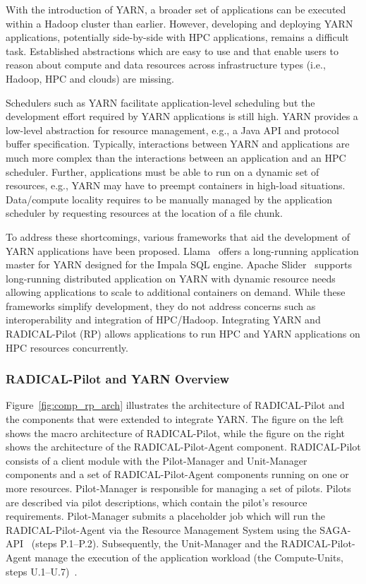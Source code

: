 With the introduction of YARN, a broader set of applications can be executed
within a Hadoop cluster than earlier. However, developing and deploying YARN
applications, potentially side-by-side with HPC applications, remains a
difficult task. Established abstractions which are easy to use and that enable
users to reason about compute and data resources across infrastructure types
(i.e., Hadoop, HPC and clouds) are missing.

Schedulers such as YARN facilitate application-level scheduling but the
development effort required by YARN applications is still high. YARN provides a
low-level abstraction for resource management, e.g., a Java API and protocol
buffer specification. Typically, interactions between YARN and applications are
much more complex than the interactions between an application and an HPC
scheduler. Further, applications must be able to run on a dynamic set of
resources, e.g., YARN may have to preempt containers in high-load situations.
Data/compute locality requires to be manually managed by the application scheduler
by requesting resources at the location of a file chunk.

To address these shortcomings, various frameworks that aid the development of
YARN applications have been proposed. Llama~\cite{llama} offers a long-running
application master for YARN designed for the Impala SQL engine. Apache
Slider~\cite{apache-slider} supports long-running distributed application on
YARN with dynamic resource needs allowing applications to scale to additional
containers on demand. While these frameworks simplify development, they do not
address concerns such as interoperability and integration of HPC/Hadoop.
Integrating YARN and RADICAL-Pilot (RP) allows applications to run HPC and YARN
applications on HPC resources concurrently.

\subsubsection*{RADICAL-Pilot and YARN Overview}
\label{sssec:rp_yarn}

Figure~\ref{fig:comp_rp_arch} illustrates the architecture of RADICAL-Pilot and
the components that were extended to integrate YARN. The figure on the left
shows the macro architecture of RADICAL-Pilot, while the figure on the right
shows the architecture of the RADICAL-Pilot-Agent component. RADICAL-Pilot
consists of a client module with the Pilot-Manager and Unit-Manager components
and a set of RADICAL-Pilot-Agent components running on one or more resources.
Pilot-Manager is responsible for managing a set of pilots. Pilots are described
via pilot descriptions, which contain the pilot's resource requirements.
Pilot-Manager submits a placeholder job which will run the RADICAL-Pilot-Agent
via the Resource Management System using the SAGA-API~\cite{merzky2015saga}
(steps P.1--P.2). Subsequently, the Unit-Manager and the RADICAL-Pilot-Agent
manage the execution of the application workload (the Compute-Units, steps
U.1--U.7)~\cite{merzky2019using}.

